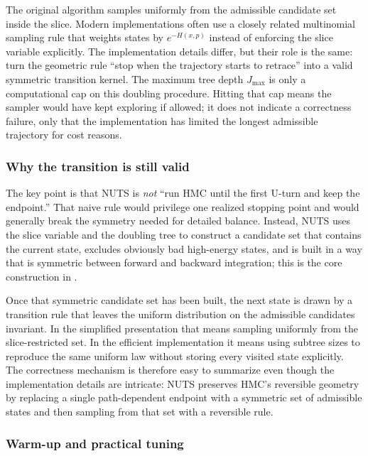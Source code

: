 The original algorithm samples uniformly from the admissible candidate set inside the slice.
Modern implementations often use a closely related multinomial sampling rule that weights states by $e^{-H(x,p)}$ instead of enforcing the slice variable explicitly.
The implementation details differ, but their role is the same: turn the geometric rule ``stop when the trajectory starts to retrace'' into a valid symmetric transition kernel.
The maximum tree depth \(J_{\max}\) is only a computational cap on this doubling procedure.
Hitting that cap means the sampler would have kept exploring if allowed; it does not indicate a correctness failure, only that the implementation has limited the longest admissible trajectory for cost reasons.

\subsubsection{Why the transition is still valid}
\label{subsubsec:nuts-correctness}

The key point is that NUTS is \emph{not} ``run HMC until the first U-turn and keep the endpoint.''
That naive rule would privilege one realized stopping point and would generally break the symmetry needed for detailed balance.
Instead, NUTS uses the slice variable and the doubling tree to construct a candidate set that contains the current state, excludes obviously bad high-energy states, and is built in a way that is symmetric between forward and backward integration; this is the core construction in \citet[\S\S3.1.1--3.1.2]{hoffman_gelman_2014_nuts}.

Once that symmetric candidate set has been built, the next state is drawn by a transition rule that leaves the uniform distribution on the admissible candidates invariant.
In the simplified presentation that means sampling uniformly from the slice-restricted set.
In the efficient implementation it means using subtree sizes to reproduce the same uniform law without storing every visited state explicitly.
The correctness mechanism is therefore easy to summarize even though the implementation details are intricate:
NUTS preserves HMC's reversible geometry by replacing a single path-dependent endpoint with a symmetric set of admissible states and then sampling from that set with a reversible rule.

\subsubsection{Warm-up and practical tuning}
\label{subsubsec:nuts-warmup}

